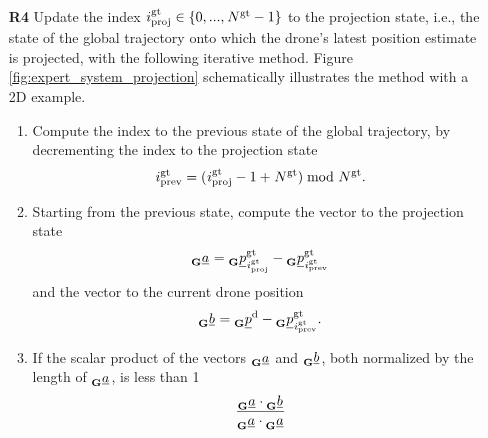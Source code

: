 \begin{itemize}
    
    \item [\textbf{R4}] Update the index 
    $\idx[]{\glotraj}{\proj}{}{} \in \{0, ..., \num[]{\glotraj}{}{}{} - 1\}$ 
    to the projection state,
    i.e., the state of the global trajectory
    onto which the drone's latest position estimate is projected,
    with the following iterative method.
    Figure \ref{fig:expert_system_projection} 
    schematically illustrates the method with a 2D example.
    \begin{enumerate}
        \item Compute the index to the previous state of the global trajectory,
        by decrementing the index to the projection state
        \begin{equation}
            \idx[]{\glotraj}{\prev}{}{} 
            = 
            (\idx[]{\glotraj}{\proj}{}{} - 1 + \num[]{\glotraj}{}{}{}) 
            \bmod 
            \num[]{\glotraj}{}{}{}.
        \end{equation}
        \item Starting from the previous state, 
        compute the vector to the projection state
        \begin{equation} \label{eq:vec_prev_state_2_proj_state}
            \anything[]{}{}{\grs}{}{\underline a}
            = 
            \pos[]{\glotraj}{\idx[]{\glotraj}{\proj}{}{}}{\grs}{}
            - 
            \pos[]{\glotraj}{\idx[]{\glotraj}{\prev}{}{}}{\grs}{}
        \end{equation}
        and the vector to the current drone position
        \begin{equation} \label{eq:vec_prev_state_2_drone}
            \anything[]{}{}{\grs}{}{\underline b}
            = 
            \pos[]{\drone}{}{\grs}{}
            - 
            \pos[]{\glotraj}{\idx[]{\glotraj}{\prev}{}{}}{\grs}{}.
        \end{equation}
        \item If the scalar product of the vectors 
        $\anything[]{}{}{\grs}{}{\underline a}$ 
        and 
        $\anything[]{}{}{\grs}{}{\underline b}$, 
        both normalized by the length of $\anything[]{}{}{\grs}{}{\underline a}$,
        is less than 1
        \begin{align} \label{eq:norm_dot_prod_criterion}
            \frac{
                \anything[]{}{}{\grs}{}{\underline a} 
                \cdot 
                \anything[]{}{}{\grs}{}{\underline b}
            }{  
                \anything[]{}{}{\grs}{}{\underline a} 
                \cdot 
                \anything[]{}{}{\grs}{}{\underline a}
}
\end{align}
\end{enumerate}
\end{itemize}
